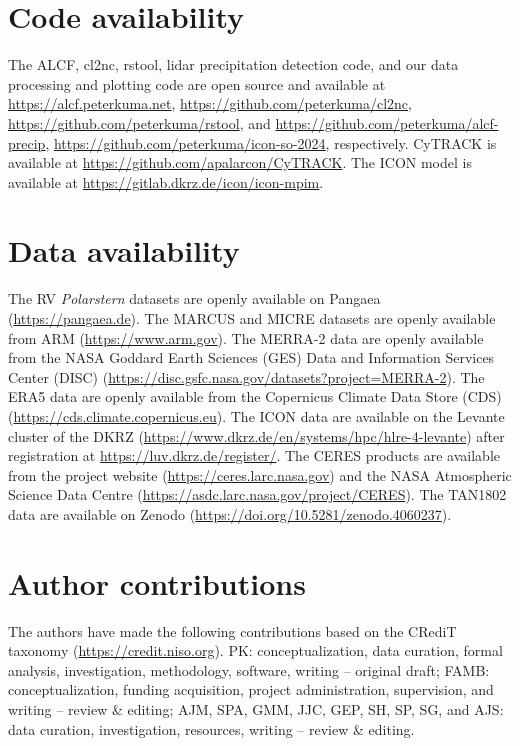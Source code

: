 \documentclass[12pt,a4paper]{article}
\begin{document}
\section*{Code availability}

The ALCF, cl2nc, rstool, lidar precipitation detection code, and our data
processing and plotting code are open source and available at
\url{https://alcf.peterkuma.net}, \url{https://github.com/peterkuma/cl2nc},
\url{https://github.com/peterkuma/rstool}, and
\url{https://github.com/peterkuma/alcf-precip},
\url{https://github.com/peterkuma/icon-so-2024}, respectively. CyTRACK is
available at \url{https://github.com/apalarcon/CyTRACK}. The ICON model is
available at \url{https://gitlab.dkrz.de/icon/icon-mpim}.

\section*{Data availability}

The RV \emph{Polarstern} datasets are openly available on Pangaea
(\url{https://pangaea.de}). The MARCUS and MICRE datasets are openly available
from ARM (\url{https://www.arm.gov}). The MERRA-2 data are openly available
from the NASA Goddard Earth Sciences (GES) Data and Information Services Center
(DISC) (\url{https://disc.gsfc.nasa.gov/datasets?project=MERRA-2}).  The ERA5
data are openly available from the Copernicus Climate Data Store (CDS)
(\url{https://cds.climate.copernicus.eu}). The ICON data are available on the
Levante cluster of the DKRZ
(\url{https://www.dkrz.de/en/systems/hpc/hlre-4-levante}) after registration at
\url{https://luv.dkrz.de/register/}. The CERES products are available from the
project website (\url{https://ceres.larc.nasa.gov}) and the NASA Atmospheric
Science Data Centre (\url{https://asdc.larc.nasa.gov/project/CERES}).  The
TAN1802 data are available on Zenodo
(\url{https://doi.org/10.5281/zenodo.4060237}).


\section*{Author contributions}

The authors have made the following contributions based on the CRediT taxonomy
(\url{https://credit.niso.org}).  PK: conceptualization, data curation, formal
analysis, investigation, methodology, software, writing – original draft; FAMB:
conceptualization, funding acquisition, project administration, supervision,
and writing – review \& editing; AJM, SPA, GMM, JJC, GEP, SH, SP, SG, and AJS:
data curation, investigation, resources, writing – review \& editing.

\fontsize{11pt}{13pt}\selectfont
\setlength{\bibsep}{0.0pt}

\end{document}
